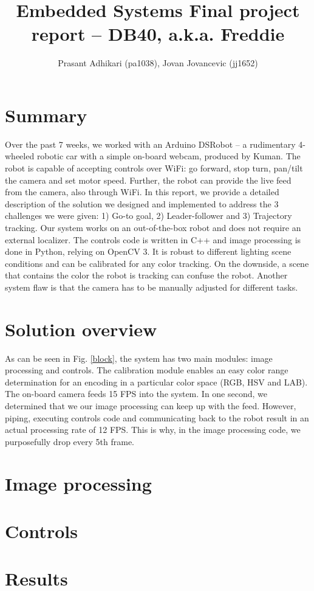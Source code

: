 \documentclass[12pt, twoside, a4paper, titlepage]{article}
\begin{document}
\title{Embedded Systems \linebreak Final project report -- DB40, a.k.a. Freddie }
\author{Prasant Adhikari (pa1038), Jovan Jovancevic (jj1652)}
\maketitle

\section{Summary}
Over the past 7 weeks, we worked with an Arduino DSRobot -- a rudimentary 4-wheeled robotic car with a simple on-board webcam, produced by Kuman. The robot is capable of accepting controls over WiFi: go forward, stop turn, pan/tilt the camera and set motor speed. Further, the robot can provide the live feed from the camera, also through WiFi. In this report, we provide a detailed description of the solution we designed and implemented to address the 3 challenges we were given: 1) Go-to goal, 2) Leader-follower and 3) Trajectory tracking. Our system works on an out-of-the-box robot and does not require an external localizer. The controls code is written in C++ and image processing is done in Python, relying on OpenCV 3. It is robust to different lighting scene conditions and can be calibrated for any color tracking. On the downside, a scene that contains the color the robot is tracking can confuse the robot. Another system flaw is that the camera has to be manually adjusted for different tasks.

\section{Solution overview}
As can be seen in Fig. \ref{block}, the system has two main modules: image processing and controls. The calibration module enables an easy color range determination for an encoding in a particular color space (RGB, HSV and LAB). The on-board camera feeds 15 FPS into the system. In one second, we determined that we our image processing can keep up with the feed. However, piping, executing controls code and communicating back to the robot result in an actual processing rate of 12 FPS. This is why, in the image processing code, we purposefully drop every 5th frame. 




\section{Image processing}

\section{Controls}

\section{Results}
\end{document}
